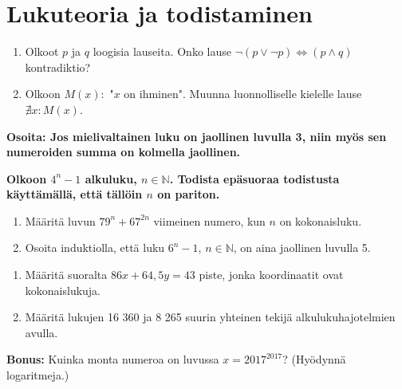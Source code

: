 \documentclass[12pt,finnish]{exam}
\begin{document}
 \section*{Lukuteoria ja todistaminen}
 
\vspace{5mm}
 
\begin{questions}
\bfseries
\question
\mdseries
\begin{enumerate}[label=\textbf{\alph*)}]
\item Olkoot $p$ ja $q$ loogisia lauseita. Onko lause $\neg (p \lor \neg p) \Leftrightarrow (p \land q)$ kontradiktio?
\item Olkoon \(M(x):\) "$x$ on ihminen". Muunna luonnolliselle kielelle lause \(\nexists x:M(x)\).
\end{enumerate}
\vspace{1ex}


\bfseries
\question
\mdseries
Osoita: Jos mielivaltainen luku on jaollinen luvulla 3, niin myös sen numeroiden summa on kolmella jaollinen.

\bfseries
\question
\mdseries
Olkoon \(4^n-1\) alkuluku, \(n\in \mathbb{N}\). Todista epäsuoraa todistusta käyttämällä, että tällöin \(n\) on pariton.

\vspace{1ex}


\bfseries
\question
\mdseries
\begin{enumerate}[label=\textbf{\alph*)}]
\item Määritä luvun $79^n+67^{2n}$ viimeinen numero, kun \(n\) on kokonaisluku.

\item Osoita induktiolla, että luku \(6^n-1\), \(n\in \mathbb{N}\), on aina jaollinen luvulla 5.
\end{enumerate}

\bfseries
\question
\mdseries
\begin{enumerate}[label=\textbf{\alph*)}]
\item Määritä suoralta \(86x+64,\!5y=43\) piste, jonka koordinaatit ovat kokonaislukuja.

\item Määritä lukujen 16 360 ja 8 265 suurin yhteinen tekijä alkulukuhajotelmien avulla.
\end{enumerate}

\end{questions}
\textbf{Bonus: } Kuinka monta numeroa on luvussa $x=2017^{2017}$? (Hyödynnä logaritmeja.)
\thispagestyle{empty}
\end{document}
